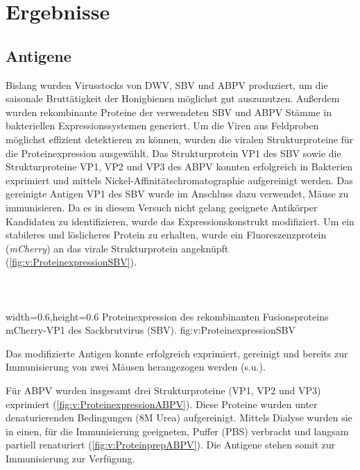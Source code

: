 \section{Ergebnisse}

\subsection{Antigene}

Bislang wurden Virusstocks von DWV, SBV und ABPV produziert, um die saisonale Bruttätigkeit der Honigbienen möglichst gut auszunutzen. Außerdem wurden rekombinante Proteine der verwendeten SBV und ABPV Stämme in bakteriellen Expressionssystemen generiert. Um die Viren aus Feldproben möglichst effizient detektieren zu können, wurden die viralen Strukturproteine für die Proteinexpression ausgewählt. 
Das Strukturprotein VP1 des SBV sowie die Strukturproteine VP1, VP2 und VP3 des ABPV konnten erfolgreich in Bakterien exprimiert und mittels Nickel-Affinitätschromatographie aufgereinigt werden. Das gereinigte Antigen VP1 des SBV wurde im Anschluss dazu verwendet, Mäuse zu immunisieren. Da es in diesem Versuch nicht gelang geeignete Antikörper Kandidaten zu identifizieren, wurde das Expressionskonstrukt modifiziert. Um ein stabileres und löslicheres Protein zu erhalten, wurde ein Fluoreszenzprotein (\textit{mCherry}) an das virale Strukturprotein angeknüpft (\cref{fig:v:ProteinexpressionSBV}).
\\
\\
\\
\\
{width=0.6\textwidth,height=0.6\textheight}
{Proteinexpression des rekombinanten Fusionsproteins mCherry-VP1 des Sackbrutvirus (SBV).}%
{}%
{fig:v:ProteinexpressionSBV}%

Das modifizierte Antigen konnte erfolgreich exprimiert, gereinigt und bereits zur Immunisierung von zwei Mäusen herangezogen werden (s.u.). 

Für ABPV wurden insgesamt drei Strukturproteine (VP1, VP2 und VP3) exprimiert (\cref{fig:v:ProteinexpressionABPV}). Diese Proteine wurden unter denaturierenden Bedingungen (8M Urea) aufgereinigt. Mittels Dialyse wurden sie in einen, für die Immunisierung geeigneten, Puffer (PBS) verbracht und langsam partiell renaturiert (\cref{fig:v:ProteinprepABPV}). Die Antigene stehen somit zur Immunisierung zur Verfügung.

